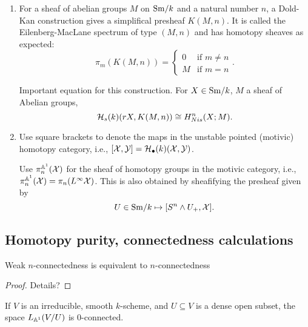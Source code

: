 \documentclass{amsart}%
\begin{document}
\begin{enumerate}
\begin{proof}
  M.V. IHES paper? Sketch of argument? It shouldn't be too hard by
  chasing components around.
\end{proof}

  \item For a sheaf of abelian groups $M$ on $\mathrm{Sm}/k$ and a natural
number $n$, a Dold-Kan construction gives a simplifical presheaf
$K(M,n)$. It is called the Eilenberg-MacLane spectrum of type $(M,n)$
and has homotopy sheaves as expected:
\begin{equation*}
  \pi_m(K(M,n)) = \begin{cases}0 & \text{if }m\neq n \\ M & \text{if } m = n \end{cases}.
\end{equation*}

Important equation for this construction. For $X\in\mathrm{Sm}/k$, $M$ a sheaf
of Abelian groups, 
  \begin{equation*}
    \mathcal{H}_s(k)(rX, K(M,n)) \cong H^n_{Nis}(X; M).
  \end{equation*}

    \item Use square brackets to denote the maps in the unstable
  pointed (motivic) homotopy category, i.e.,
  $[\mathcal{X}, \mathcal{Y}] = \mathcal{H}_{\bullet}(k)(\mathcal{X}, \mathcal{Y})$. 

  Use $\pi_n^{\mathbb{A}^1}(\mathcal{X})$ for the sheaf of homotopy
  groups in the motivic category, i.e.,
  $\pi^{\mathbb{A}^1}_n(\mathcal{X}) =
  \pi_n(L^{\infty}\mathcal{X})$.
  This is also obtained by sheafifying the presheaf given by 
  \begin{equation*}
    U \in \mathrm{Sm}/k \mapsto [S^n\wedge U_+, \mathcal{X}].
  \end{equation*}

\end{enumerate}

\subsection{Homotopy purity, connectedness calculations}

\begin{proposition}
  Weak $n$-connectedness is equivalent to $n$-connectedness
\end{proposition}

\begin{proof}
  Details?
\end{proof}

\begin{proposition}
  If $V$ is an irreducible, smooth $k$-scheme, and $U \subseteq V$ is
  a dense open subset, the space $L_{\mathbb{A}^1}(V/U)$ is $0$-connected.
\end{proposition}
\end{document}
